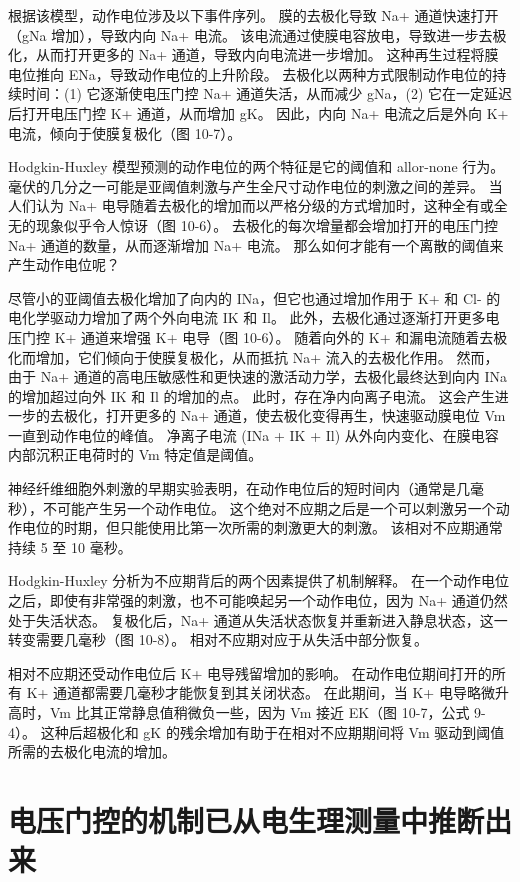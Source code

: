 根据该模型，动作电位涉及以下事件序列。 膜的去极化导致 Na+ 通道快速打开（gNa 增加），导致内向 Na+ 电流。 该电流通过使膜电容放电，导致进一步去极化，从而打开更多的 Na+ 通道，导致内向电流进一步增加。 这种再生过程将膜电位推向 ENa，导致动作电位的上升阶段。 去极化以两种方式限制动作电位的持续时间：(1) 它逐渐使电压门控 Na+ 通道失活，从而减少 gNa，(2) 它在一定延迟后打开电压门控 K+ 通道，从而增加 gK。 因此，内向 Na+ 电流之后是外向 K+ 电流，倾向于使膜复极化（图 10-7）。

Hodgkin-Huxley 模型预测的动作电位的两个特征是它的阈值和 allor-none 行为。 毫伏的几分之一可能是亚阈值刺激与产生全尺寸动作电位的刺激之间的差异。 当人们认为 Na+ 电导随着去极化的增加而以严格分级的方式增加时，这种全有或全无的现象似乎令人惊讶（图 10-6）。 去极化的每次增量都会增加打开的电压门控 Na+ 通道的数量，从而逐渐增加 Na+ 电流。 那么如何才能有一个离散的阈值来产生动作电位呢？

尽管小的亚阈值去极化增加了向内的 INa，但它也通过增加作用于 K+ 和 Cl- 的电化学驱动力增加了两个外向电流 IK 和 Il。 此外，去极化通过逐渐打开更多电压门控 K+ 通道来增强 K+ 电导（图 10-6）。 随着向外的 K+ 和漏电流随着去极化而增加，它们倾向于使膜复极化，从而抵抗 Na+ 流入的去极化作用。 然而，由于 Na+ 通道的高电压敏感性和更快速的激活动力学，去极化最终达到向内 INa 的增加超过向外 IK 和 Il 的增加的点。 此时，存在净内向离子电流。 这会产生进一步的去极化，打开更多的 Na+ 通道，使去极化变得再生，快速驱动膜电位 Vm 一直到动作电位的峰值。 净离子电流 (INa + IK + Il) 从外向内变化、在膜电容内部沉积正电荷时的 Vm 特定值是阈值。

神经纤维细胞外刺激的早期实验表明，在动作电位后的短时间内（通常是几毫秒），不可能产生另一个动作电位。 这个绝对不应期之后是一个可以刺激另一个动作电位的时期，但只能使用比第一次所需的刺激更大的刺激。 该相对不应期通常持续 5 至 10 毫秒。

Hodgkin-Huxley 分析为不应期背后的两个因素提供了机制解释。 在一个动作电位之后，即使有非常强的刺激，也不可能唤起另一个动作电位，因为 Na+ 通道仍然处于失活状态。 复极化后，Na+ 通道从失活状态恢复并重新进入静息状态，这一转变需要几毫秒（图 10-8）。 相对不应期对应于从失活中部分恢复。

相对不应期还受动作电位后 K+ 电导残留增加的影响。 在动作电位期间打开的所有 K+ 通道都需要几毫秒才能恢复到其关闭状态。 在此期间，当 K+ 电导略微升高时，Vm 比其正常静息值稍微负一些，因为 Vm 接近 EK（图 10-7，公式 9-4）。 这种后超极化和 gK 的残余增加有助于在相对不应期期间将 Vm 驱动到阈值所需的去极化电流的增加。



\section{电压门控的机制已从电生理测量中推断出来}

